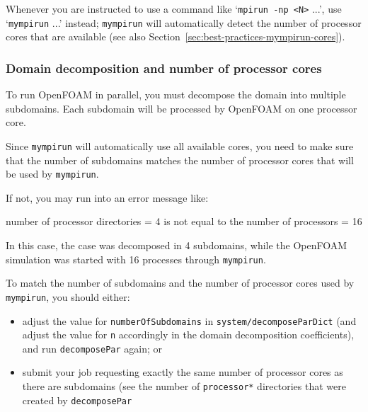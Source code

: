 \begin{prompt}
\end{prompt}

Whenever you are instructed to use a command like `\texttt{\small{mpirun -np <N>}} ...',
use `\texttt{\small{mympirun}} ...' instead; \texttt{\small{mympirun}} will automatically detect the number of
processor cores that are available (see also Section~\ref{sec:best-practices-mympirun-cores}).


\subsubsection{Domain decomposition and number of processor cores}
\label{sec:best-practices-openfoam-domain-decomposition-processor-cores}

To run OpenFOAM in parallel, you must decompose the domain into multiple subdomains.
Each subdomain will be processed by OpenFOAM on one processor core.

Since {\small\texttt{mympirun}} will automatically use all available cores, you need to make sure
that the number of subdomains matches the number of processor cores that will be used by {\small\texttt{mympirun}}.

If not, you may run into an error message like:

\begin{prompt}
number of processor directories = 4 is not equal to the number of processors = 16
\end{prompt}

In this case, the case was decomposed in 4 subdomains, while the OpenFOAM simulation was started with 16 processes
through {\small\texttt{mympirun}}.

To match the number of subdomains and the number of processor cores used by {\small\texttt{mympirun}}, 
you should either:

\begin{itemize}
\item adjust the value for {\small\texttt{numberOfSubdomains}} in {\small\texttt{system/decomposeParDict}}
(and adjust the value for {\small\texttt{n}} accordingly in the domain decomposition coefficients),
and run {\small\texttt{decomposePar}} again; or
\item submit your job requesting exactly the same number of processor cores as there are subdomains (see the
number of {\small\texttt{processor*}} directories that were created by {\small\texttt{decomposePar}}
\end{itemize}

